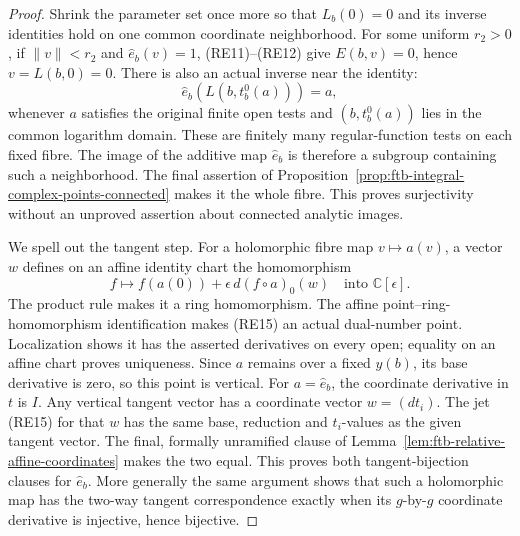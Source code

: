 \begin{proof}
Shrink the parameter set once more so that \(L_b(0)=0\)
and its inverse identities hold on one common coordinate
neighborhood.
For some uniform \(r_2>0\), if \(\|v\|<r_2\) and
\(\widehat e_b(v)=1\), (RE11)--(RE12) give
\(E(b,v)=0\), hence \(v=L(b,0)=0\).
There is also an actual inverse near the identity:
\[
                 \widehat e_b(L(b,t_b^0(a)))=a,             \tag{RE14}
\]
whenever \(a\) satisfies the original finite open tests
and \((b,t_b^0(a))\) lies in the common logarithm domain.
These are finitely many regular-function tests on each
fixed fibre.
The image of the additive map \(\widehat e_b\) is therefore
a subgroup containing such a neighborhood.
The final assertion of
Proposition~\ref{prop:ftb-integral-complex-points-connected}
makes it the whole fibre.
This proves surjectivity without an unproved assertion
about connected analytic images.

We spell out the tangent step.
For a holomorphic fibre map \(v\mapsto a(v)\), a vector \(w\)
defines on an affine identity chart the homomorphism
\[
             f\longmapsto f(a(0))
                    +\epsilon\,d(f\circ a)_0(w)
                \quad\text{into }\mathbb C[\epsilon].      \tag{RE15}
\]
The product rule makes it a ring homomorphism.
The affine point--ring-homomorphism identification makes
(RE15) an actual dual-number point.
Localization shows it has the asserted derivatives on
every open; equality on an affine chart proves uniqueness.
Since \(a\) remains over a fixed \(y(b)\), its base derivative
is zero, so this point is vertical.
For \(a=\widehat e_b\), the coordinate derivative in \(t\)
is \(I\).
Any vertical tangent vector has a coordinate vector
\(w=(dt_i)\).
The jet (RE15) for that \(w\) has the same base, reduction
and \(t_i\)-values as the given tangent vector.
The final, formally unramified clause of
Lemma~\ref{lem:ftb-relative-affine-coordinates}
makes the two equal.
This proves both tangent-bijection clauses for
\(\widehat e_b\).
More generally the same argument shows that such a
holomorphic map has the two-way tangent correspondence
exactly when its \(g\)-by-\(g\) coordinate derivative
is injective, hence bijective.


\end{proof}
